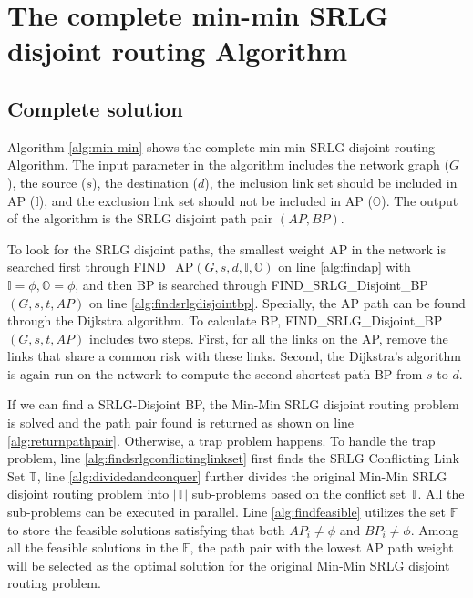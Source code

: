 \section{The complete min-min SRLG disjoint routing Algorithm}
\label{sec:Route Algorithm}
\subsection{Complete solution}
Algorithm \ref{alg:min-min} shows the complete min-min SRLG disjoint routing Algorithm. The input parameter in the algorithm includes  the network graph ($G$), the source ($s$), the destination  ($d$), the inclusion link set should be included in AP ($\mathbb{I}$), and the exclusion link set should not be included in AP ($\mathbb{O}$). The output of the algorithm is the SRLG disjoint path pair $(AP,BP)$.

To look for the SRLG disjoint paths, the smallest weight AP in the network is searched  first through FIND\_AP$(G,s,d, \mathbb{I},\mathbb{O})$ on line \ref{alg:findap} with $\mathbb{I}=\phi,\mathbb{O}=\phi$, and then BP is searched through  FIND\_SRLG\_Disjoint\_BP
$(G,s,t,AP)$ on line \ref{alg:findsrlgdisjointbp}. Specially, the AP path can be found through the Dijkstra algorithm. To calculate BP, FIND\_SRLG\_Disjoint\_BP
$(G,s,t,AP)$ includes two steps. First, for all the links on the AP, remove the links that share a common risk with these links. Second, the Dijkstra's algorithm is again run on the  network to compute the second shortest path BP from $s$ to $d$.

If we can find a SRLG-Disjoint BP, the Min-Min SRLG disjoint routing problem is solved and  the path pair found is returned as shown on line \ref{alg:returnpathpair}. Otherwise, a trap problem happens. To handle the trap problem, line \ref{alg:findsrlgconflictinglinkset} first finds the SRLG Conflicting Link Set $\mathbb{T}$, line \ref{alg:dividedandconquer} further divides the original  Min-Min SRLG disjoint routing problem into $\left| \mathbb{T} \right|$ sub-problems based on the conflict set $\mathbb{T}$. All the sub-problems can be executed in parallel. Line \ref{alg:findfeasible} utilizes the set $\mathbb{F}$ to store the feasible solutions  satisfying that  both $A{P_i} \ne \phi$ and $B{P_i} \ne \phi$. Among all the feasible solutions in the $\mathbb{F}$, the path pair with the lowest AP path weight will be selected as the optimal solution for the original Min-Min SRLG disjoint routing problem.

